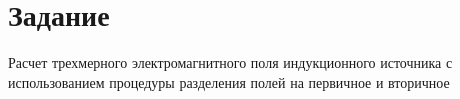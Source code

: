 \chapter*{Задание}


Расчет трехмерного электромагнитного поля индукционного источника с использованием процедуры разделения полей на первичное и вторичное